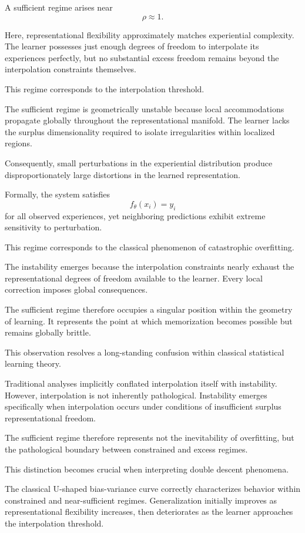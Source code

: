 \documentclass[12pt,a4paper]{article}
\begin{document}
A sufficient regime arises near
\[
\rho \approx 1.
\]

Here, representational flexibility approximately matches experiential complexity. The learner possesses just enough degrees of freedom to interpolate its experiences perfectly, but no substantial excess freedom remains beyond the interpolation constraints themselves.

This regime corresponds to the interpolation threshold.

The sufficient regime is geometrically unstable because local accommodations propagate globally throughout the representational manifold. The learner lacks the surplus dimensionality required to isolate irregularities within localized regions.

Consequently, small perturbations in the experiential distribution produce disproportionately large distortions in the learned representation.

Formally, the system satisfies
\[
f_\theta(x_i) = y_i
\]
for all observed experiences, yet neighboring predictions exhibit extreme sensitivity to perturbation.

This regime corresponds to the classical phenomenon of catastrophic overfitting.

The instability emerges because the interpolation constraints nearly exhaust the representational degrees of freedom available to the learner. Every local correction imposes global consequences.

The sufficient regime therefore occupies a singular position within the geometry of learning. It represents the point at which memorization becomes possible but remains globally brittle.

This observation resolves a long-standing confusion within classical statistical learning theory.

Traditional analyses implicitly conflated interpolation itself with instability. However, interpolation is not inherently pathological. Instability emerges specifically when interpolation occurs under conditions of insufficient surplus representational freedom.

The sufficient regime therefore represents not the inevitability of overfitting, but the pathological boundary between constrained and excess regimes.

This distinction becomes crucial when interpreting double descent phenomena.

The classical U-shaped bias-variance curve correctly characterizes behavior within constrained and near-sufficient regimes. Generalization initially improves as representational flexibility increases, then deteriorates as the learner approaches the interpolation threshold.
\end{document}
